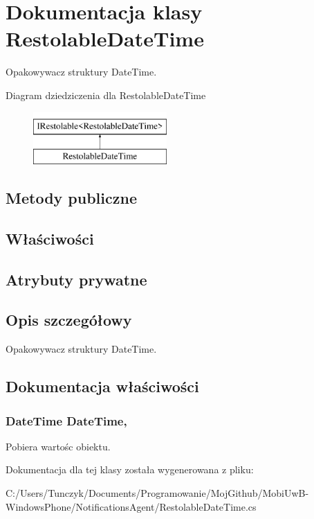 \hypertarget{a00048}{}\section{Dokumentacja klasy Restolable\+Date\+Time}
\label{a00048}


Opakowywacz struktury Date\+Time.  


Diagram dziedziczenia dla Restolable\+Date\+Time\begin{figure}[H]
\begin{center}
\leavevmode
\includegraphics[height=2.000000cm]{d4/dca/a00048}
\end{center}
\end{figure}
\subsection*{Metody publiczne}
\subsection*{Właściwości}
\subsection*{Atrybuty prywatne}


\subsection{Opis szczegółowy}
Opakowywacz struktury Date\+Time. 



\subsection{Dokumentacja właściwości}
\hypertarget{a00048_a42cca9ab28f005448ef73e219059b918}{}
\subsubsection[{Date\+Time}]{\setlength{\rightskip}{0pt plus 5cm}Date\+Time Date\+Time\hspace{0.3cm}{\ttfamily [get]}, {}}\label{a00048_a42cca9ab28f005448ef73e219059b918}


Pobiera wartośc obiektu. 



Dokumentacja dla tej klasy została wygenerowana z pliku\+:\begin{DoxyCompactItemize}
\item 
C\+:/\+Users/\+Tunczyk/\+Documents/\+Programowanie/\+Moj\+Github/\+Mobi\+Uw\+B-\/\+Windows\+Phone/\+Notifications\+Agent/Restolable\+Date\+Time.\+cs\end{DoxyCompactItemize}
